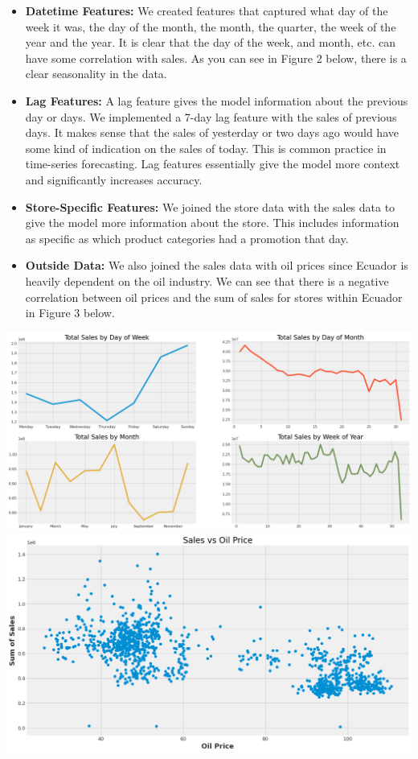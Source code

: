 \documentclass[12pt]{article}
\begin{document}
\begin{itemize}
    \item \textbf{Datetime Features:} We created features that captured what day of the week it was, the day of the month, the month, the quarter, the week of the year and the year. It is clear that the day of the week, and month, etc. can have some correlation with sales. As you can see in Figure 2 below, there is a clear seasonality in the data.
    \item \textbf{Lag Features:} A lag feature gives the model information about the previous day or days. We implemented a 7-day lag feature with the sales of previous days. It makes sense that the sales of yesterday or two days ago would have some kind of indication on the sales of today. This is common practice in time-series forecasting. Lag features essentially give the model more context and significantly increases accuracy.
    \item \textbf{Store-Specific Features:} We joined the store data with the sales data to give the model more information about the store. This includes information as specific as which product categories had a promotion that day.
    \item \textbf{Outside Data:} We also joined the sales data with oil prices since Ecuador is heavily dependent on the oil industry\cite{kaggle}. We can see that there is a negative correlation between oil prices and the sum of sales for stores within Ecuador in Figure 3 below.
\end{itemize}
\includegraphics[width=\textwidth]{figures/seasonality.png}
\includegraphics[width=\textwidth]{figures/oil.png}
\end{document}
